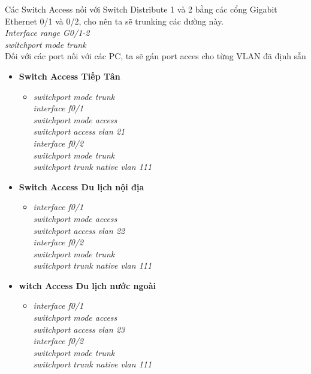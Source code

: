 \documentclass[a4paper, 12pt]{article}
\begin{document}
\begin{itemize}
\hspace*{1cm}Các Switch Access nối với Switch Distribute 1 và 2 bằng các cổng Gigabit Ethernet 0/1 và 0/2, cho nên ta sẽ trunking các đường này.\\
\hspace*{2cm}\textit{Interface range G0/1-2\\
\hspace*{2cm}switchport mode trunk\\}
\hspace*{1cm}Đối với các port nối với các PC, ta sẽ gán port acces cho từng VLAN đã định sẵn
  \begin{itemize}
    \item \textbf{Switch Access Tiếp Tân}
    \begin{itemize}
      \item \textit{switchport mode trunk\\
                    interface f0/1\\
                    switchport mode access\\
                    switchport access vlan 21\\
                    interface f0/2\\
                    switchport mode trunk\\
                    switchport trunk native vlan 111}   
      
    \end{itemize}
   
     \item \textbf{Switch Access  Du lịch nội địa}
     \begin{itemize}
      \item \textit{interface f0/1\\
                    switchport mode access\\
                    switchport access vlan 22\\
                    interface f0/2\\
                    switchport mode trunk\\
                    switchport trunk native vlan 111}
     
    \end{itemize}
     \item \textbf{witch Access  Du lịch nước ngoài}
     \begin{itemize}
      \item \textit{interface f0/1\\
                    switchport mode access\\
                    switchport access vlan 23\\
                    interface f0/2\\
                    switchport mode trunk\\
                    switchport trunk native vlan 111\\}
     

\end{itemize}
\end{itemize}
\end{itemize}
\end{document}
